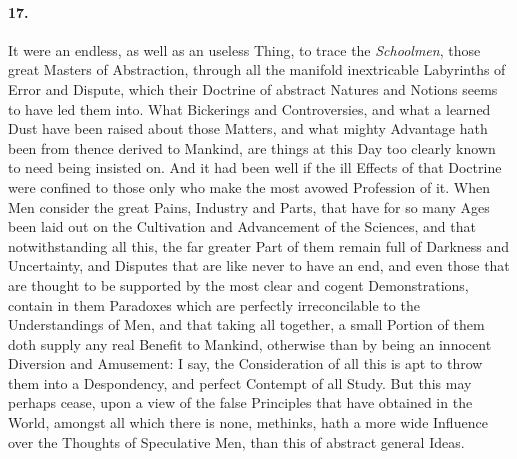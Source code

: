 \documentclass[]{article}
\newenvironment{sectionbody}{}{}
\begin{document}
\begin{sectionbody}
\paragraph{17.} It were an endless, as well as an useless Thing, to trace the
\emph{Schoolmen}, those great Masters of Abstraction, through
all the manifold inextricable Labyrinths of Error and Dispute,
which their Doctrine of abstract Natures and Notions seems to
have led them into.  What Bickerings and Controversies, and what
a learned Dust have been raised about those Matters, and what
mighty Advantage hath been from thence derived to Mankind, are
things at this Day too clearly known to need being insisted on.
And it had been well if the ill Effects of that Doctrine were
confined to those only who make the most avowed Profession of it.
When Men consider the great Pains, Industry and Parts, that have
for so many Ages been laid out on the Cultivation and Advancement
of the Sciences, and that notwithstanding all this, the far
greater Part of them remain full of Darkness and Uncertainty, and
Disputes that are like never to have an end, and even those that
are thought to be supported by the most clear and cogent
Demonstrations, contain in them Paradoxes which are perfectly
irreconcilable to the Understandings of Men, and that taking all
together, a small Portion of them doth supply any real Benefit to
Mankind, otherwise than by being an innocent Diversion and
Amusement: I say, the Consideration of all this is apt to throw
them into a Despondency, and perfect Contempt of all Study.  But
this may perhaps cease, upon a view of the false Principles that
have obtained in the World, amongst all which there is none,
methinks, hath a more wide Influence over the Thoughts of
Speculative Men, than this of abstract general Ideas.




\end{sectionbody}
\end{document}
